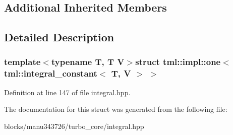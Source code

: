 \subsection*{Additional Inherited Members}


\subsection{Detailed Description}
\subsubsection*{template$<$typename T, T V$>$struct tml\+::impl\+::one$<$ tml\+::integral\+\_\+constant$<$ T, V $>$ $>$}



Definition at line 147 of file integral.\+hpp.



The documentation for this struct was generated from the following file\+:\begin{DoxyCompactItemize}
\item 
blocks/manu343726/turbo\+\_\+core/integral.\+hpp\end{DoxyCompactItemize}
